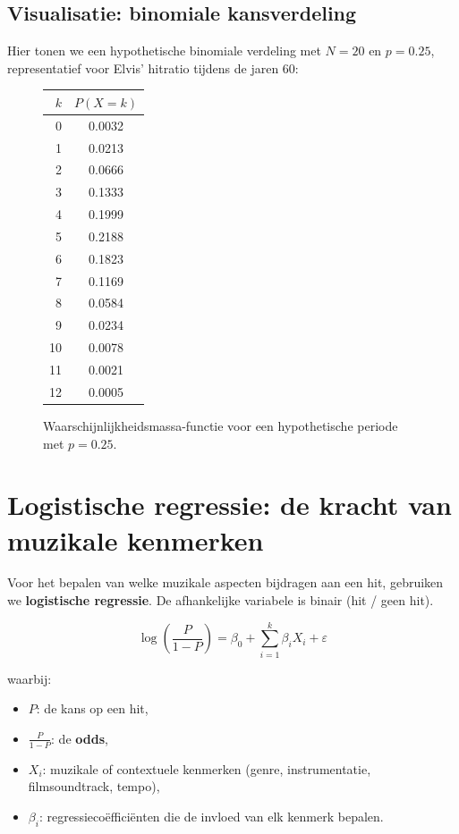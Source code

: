 \documentclass{book}
\begin{document}
	\subsection{Visualisatie: binomiale kansverdeling}
	
	Hier tonen we een hypothetische binomiale verdeling met $N=20$ en $p = 0.25$, representatief voor 
	Elvis' hitratio tijdens de jaren 60:
	
	\begin{figure}[h!]
		\centering
		\begin{tabular}{r c}
			$k$ & $P(X=k)$ \\
			\hline
			0  & 0.0032 \\
			1  & 0.0213 \\
			2  & 0.0666 \\
			3  & 0.1333 \\
			4  & 0.1999 \\
			5  & 0.2188 \\
			6  & 0.1823 \\
			7  & 0.1169 \\
			8  & 0.0584 \\
			9  & 0.0234 \\
			10 & 0.0078 \\
			11 & 0.0021 \\
			12 & 0.0005 \\
		\end{tabular}
		\caption{Waarschijnlijkheidsmassa-functie voor een hypothetische periode met $p = 0.25$.}
		\label{fig:binomiaal_hypothetisch}
	\end{figure}
	
	\section{Logistische regressie: de kracht van muzikale kenmerken}
	
	Voor het bepalen van welke muzikale aspecten bijdragen aan een hit, gebruiken we 
	\textbf{logistische regressie}. De afhankelijke variabele is binair (hit / geen hit). 
	
	\[
	\log\!\left(\frac{P}{1 - P}\right)
	= \beta_0 + \sum_{i=1}^k \beta_i X_i + \varepsilon
	\]
	
	waarbij:
	
	\begin{itemize}
		\item $P$: de kans op een hit,
		\item $\frac{P}{1-P}$: de \textbf{odds},
		\item $X_i$: muzikale of contextuele kenmerken (genre, instrumentatie, filmsoundtrack, tempo),
		\item $\beta_i$: regressieco\"effici\"enten die de invloed van elk kenmerk bepalen.
	\end{itemize}
	
\end{document}
